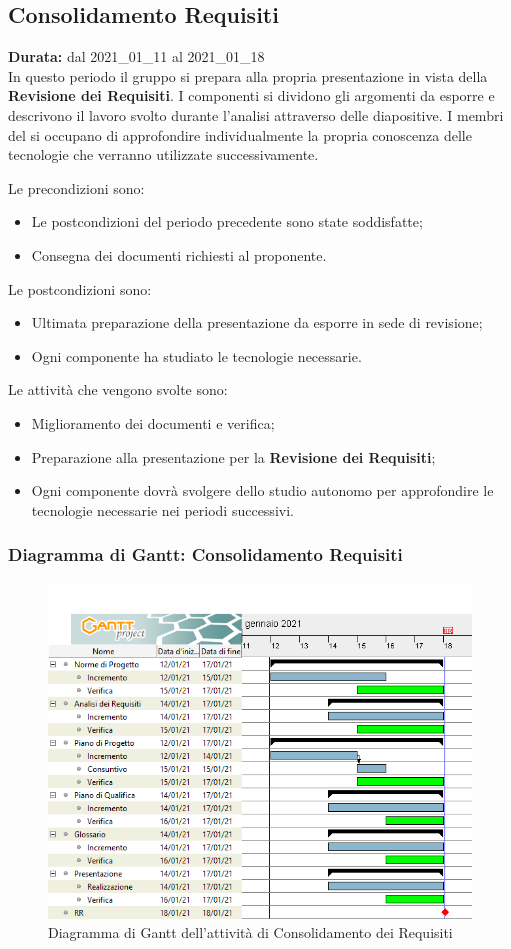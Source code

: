 \subsection{Consolidamento Requisiti}
\label{consolidamento_requisiti}
\textbf{Durata:} dal 2021\_01\_11 al 2021\_01\_18\\
In questo periodo il gruppo si prepara alla propria presentazione in vista della \textbf{Revisione dei Requisiti}.
I componenti si dividono gli argomenti da esporre e descrivono il lavoro svolto durante l'analisi attraverso delle diapositive.
I membri del  si occupano di approfondire individualmente la propria conoscenza delle tecnologie che verranno utilizzate successivamente.

Le precondizioni sono:
\begin{itemize}
    \item Le postcondizioni del periodo precedente sono state soddisfatte;
    \item Consegna dei documenti richiesti al proponente.
\end{itemize}

Le postcondizioni sono:
\begin{itemize}
    \item Ultimata preparazione della presentazione da esporre in sede di revisione;
    \item Ogni componente ha studiato le tecnologie necessarie.
\end{itemize}
Le attività che vengono svolte sono:
\begin{itemize}
    \item Miglioramento dei documenti e verifica;
    \item Preparazione alla presentazione per la \textbf{Revisione dei Requisiti};
    \item Ogni componente dovrà svolgere dello studio autonomo per approfondire le tecnologie necessarie nei periodi successivi.  
\end{itemize}

\newpage
\subsubsection{Diagramma di Gantt: Consolidamento Requisiti}
\begin{figure}[ht]
    \centering
    \includegraphics[width=\textwidth]{Immagini/GanttConsolidamentoRequisiti}
    \caption{Diagramma di Gantt dell'attività di Consolidamento dei Requisiti}
\end{figure}
